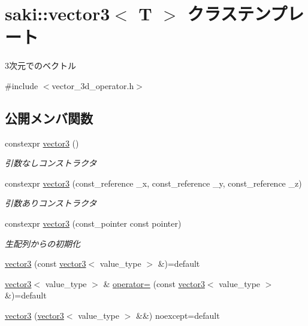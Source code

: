 \hypertarget{classsaki_1_1vector3}{}\section{saki\+:\+:vector3$<$ T $>$ クラステンプレート}
\label{classsaki_1_1vector3}


3次元でのベクトル  




{\ttfamily \#include $<$vector\+\_\+3d\+\_\+operator.\+h$>$}

\subsection*{公開メンバ関数}
\begin{DoxyCompactItemize}
\item 
constexpr \mbox{\hyperlink{classsaki_1_1vector3_af8c424a90ac24c595f7f9f74c74a9db3}{vector3}} ()
\begin{DoxyCompactList}\small\item\em 引数なしコンストラクタ \end{DoxyCompactList}\item 
constexpr \mbox{\hyperlink{classsaki_1_1vector3_a2ac12ac3883e0d3eced195d84268e2dc}{vector3}} (const\+\_\+reference \+\_\+x, const\+\_\+reference \+\_\+y, const\+\_\+reference \+\_\+z)
\begin{DoxyCompactList}\small\item\em 引数ありコンストラクタ \end{DoxyCompactList}\item 
constexpr \mbox{\hyperlink{classsaki_1_1vector3_ac8b0372f738282716b0089d489775c61}{vector3}} (const\+\_\+pointer const pointer)
\begin{DoxyCompactList}\small\item\em 生配列からの初期化 \end{DoxyCompactList}\item 
\mbox{\hyperlink{classsaki_1_1vector3_aa8ab59086636c03062a54515c5d30162}{vector3}} (const \mbox{\hyperlink{classsaki_1_1vector3}{vector3}}$<$ value\+\_\+type $>$ \&)=default
\item 
\mbox{\hyperlink{classsaki_1_1vector3}{vector3}}$<$ value\+\_\+type $>$ \& \mbox{\hyperlink{classsaki_1_1vector3_a9f7a6db4eb38f4b0551c0e2250326327}{operator=}} (const \mbox{\hyperlink{classsaki_1_1vector3}{vector3}}$<$ value\+\_\+type $>$ \&)=default
\item 
\mbox{\hyperlink{classsaki_1_1vector3_a50a48aa79b10d3cdcfcd9a0a0a5801e5}{vector3}} (\mbox{\hyperlink{classsaki_1_1vector3}{vector3}}$<$ value\+\_\+type $>$ \&\&) noexcept=default

\end{DoxyCompactItemize}
